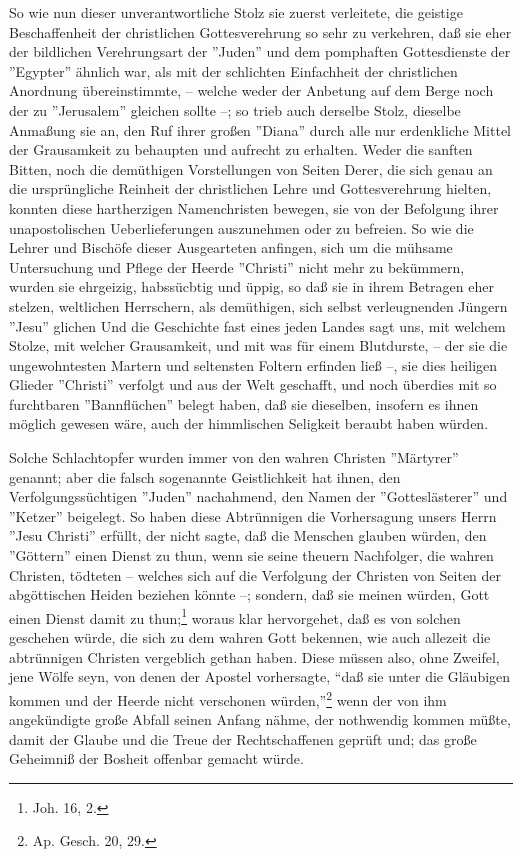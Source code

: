 So wie nun dieser unverantwortliche Stolz sie zuerst verleitete, die geistige
Beschaffenheit der christlichen Gottesverehrung so sehr zu verkehren, daß sie
eher der bildlichen Verehrungsart der ''Juden'' und dem pomphaften Gottesdienste
der ''Egypter'' ähnlich war, als mit der schlichten Einfachheit der christlichen
Anordnung übereinstimmte, -- welche weder der Anbetung auf dem Berge noch der zu
''Jerusalem'' gleichen sollte --; so trieb auch derselbe Stolz, dieselbe
Anmaßung sie an, den Ruf ihrer großen ''Diana'' durch alle nur erdenkliche
Mittel der Grausamkeit zu behaupten und aufrecht zu erhalten. Weder die sanften
Bitten, noch die demüthigen Vorstellungen von Seiten Derer, die sich genau an
die ursprüngliche Reinheit der christlichen Lehre und Gottesverehrung hielten,
konnten diese hartherzigen Namenchristen bewegen, sie von der Befolgung ihrer
unapostolischen Ueberlieferungen auszunehmen oder zu befreien. So wie die Lehrer
und Bischöfe dieser Ausgearteten anfingen, sich um die mühsame Untersuchung und
Pflege der Heerde ''Christi'' nicht mehr zu bekümmern, wurden sie ehrgeizig,
habssücbtig und üppig, so daß sie in ihrem Betragen eher stelzen, weltlichen
Herrschern, als demüthigen, sich selbst verleugnenden Jüngern ''Jesu'' glichen
Und die Geschichte fast eines jeden Landes sagt uns, mit welchem Stolze, mit
welcher Grausamkeit, und mit was für einem Blutdurste, -- der sie die
ungewohntesten Martern und seltensten Foltern erfinden ließ --, sie dies
heiligen Glieder ''Christi'' verfolgt und aus der Welt geschafft, und noch
überdies mit so furchtbaren ''Bannflüchen'' belegt haben, daß sie dieselben,
insofern es ihnen möglich gewesen wäre, auch der himmlischen Seligkeit beraubt
haben würden.

\medskip

Solche Schlachtopfer wurden immer von den wahren Christen ''Märtyrer'' genannt;
aber die falsch sogenannte Geistlichkeit hat ihnen, den Verfolgungssüchtigen
''Juden'' nachahmend, den Namen der ''Gotteslästerer'' und ''Ketzer'' beigelegt.
So haben diese Abtrünnigen die Vorhersagung unsers Herrn ''Jesu Christi''
erfüllt, der nicht sagte, daß die Menschen glauben würden, den ''Göttern'' einen
Dienst zu thun, wenn sie seine theuern Nachfolger, die wahren Christen, tödteten
-- welches sich auf die Verfolgung der Christen von Seiten der abgöttischen
Heiden beziehen könnte --; sondern, daß sie meinen würden, Gott einen Dienst
damit zu thun;\footnote{Joh. 16, 2.} woraus klar hervorgehet, daß es von solchen
geschehen würde, die sich zu dem wahren Gott bekennen, wie auch allezeit die
abtrünnigen Christen vergeblich gethan haben. Diese müssen also, ohne Zweifel,
jene Wölfe seyn, von denen der Apostel vorhersagte, "`daß sie unter die
Gläubigen kommen und der Heerde nicht verschonen würden,"'\footnote{Ap. Gesch.
20, 29.} wenn der von ihm angekündigte große Abfall seinen Anfang nähme, der
nothwendig kommen müßte, damit der Glaube und die Treue der Rechtschaffenen
geprüft und; das große Geheimniß der Bosheit offenbar gemacht würde.


